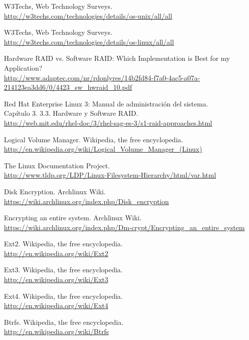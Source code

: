 \begin{thebibliography}{10}
W3Techs, Web Technology Surveys.\\
  \url{http://w3techs.com/technologies/details/os-unix/all/all}

W3Techs, Web Technology Surveys.\\
  \url{http://w3techs.com/technologies/details/os-linux/all/all}

Hardware RAID vs. Software RAID: Which Implementation is Best for my Application?\\
  \url{http://www.adaptec.com/nr/rdonlyres/14b2fd84-f7a0-4ac5-a07a-214123ea3dd6/0/4423_sw_hwraid_10.pdf}

Red Hat Enterprise Linux 3: Manual de administración del sistema.\\
  Capítulo 3. 3.3. Hardware y Software RAID.\\
  \url{http://web.mit.edu/rhel-doc/3/rhel-sag-es-3/s1-raid-approaches.html}

Logical Volume Manager. Wikipedia, the free encyclopedia.\\
  \url{http://en.wikipedia.org/wiki/Logical_Volume_Manager_(Linux)}

The Linux Documentation Project.\\
  \url{http://www.tldp.org/LDP/Linux-Filesystem-Hierarchy/html/var.html}

Disk Encryption. Archlinux Wiki.\\
  \url{https://wiki.archlinux.org/index.php/Disk_encryption}

Encrypting an entire system. Archlinux Wiki.\\
  \url{https://wiki.archlinux.org/index.php/Dm-crypt/Encrypting_an_entire_system}

Ext2. Wikipedia, the free encyclopedia.\\
  \url{http://en.wikipedia.org/wiki/Ext2}

Ext3. Wikipedia, the free encyclopedia.\\
  \url{http://en.wikipedia.org/wiki/Ext3}

Ext4. Wikipedia, the free encyclopedia.\\
  \url{http://en.wikipedia.org/wiki/Ext4}

Btrfs. Wikipedia, the free encyclopedia.\\
  \url{http://en.wikipedia.org/wiki/Btrfs}


\end{thebibliography}
